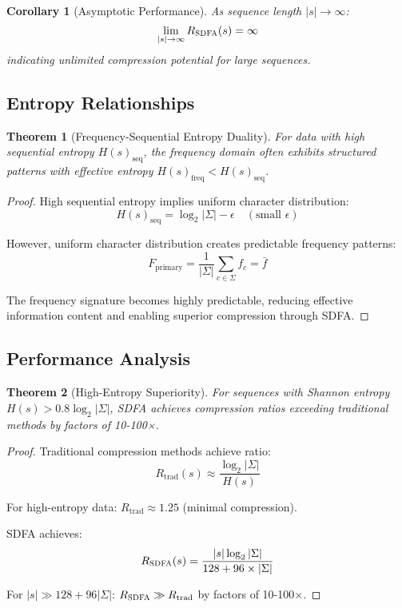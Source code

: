 \documentclass[12pt]{article}
\newtheorem{theorem}{Theorem}
\newtheorem{corollary}{Corollary}
\newcommand{\sdfa}{\textsc{SDFA}}
\newcommand{\Entropy}[1]{H\left(#1\right)}
\begin{document}
\begin{corollary}[Asymptotic Performance]
As sequence length $|s| \to \infty$:
\begin{equation}
\lim_{|s| \to \infty} R_{\sdfa}(s) = \infty
\end{equation}
indicating unlimited compression potential for large sequences.
\end{corollary}

\subsection{Entropy Relationships}

\begin{theorem}[Frequency-Sequential Entropy Duality]
For data with high sequential entropy $\Entropy{s}_{\text{seq}}$, the frequency domain often exhibits structured patterns with effective entropy $\Entropy{s}_{\text{freq}} < \Entropy{s}_{\text{seq}}$.
\end{theorem}

\begin{proof}
High sequential entropy implies uniform character distribution:
\begin{equation}
\Entropy{s}_{\text{seq}} = \log_2 |\Sigma| - \epsilon \quad (\text{small } \epsilon)
\end{equation}

However, uniform character distribution creates predictable frequency patterns:
\begin{equation}
F_{\text{primary}} = \frac{1}{|\Sigma|} \sum_{c \in \Sigma} f_c = \bar{f}
\end{equation}

The frequency signature becomes highly predictable, reducing effective information content and enabling superior compression through \sdfa{}.
\end{proof}

\subsection{Performance Analysis}

\begin{theorem}[High-Entropy Superiority]
For sequences with Shannon entropy $\Entropy{s} > 0.8 \log_2 |\Sigma|$, \sdfa{} achieves compression ratios exceeding traditional methods by factors of 10-100×.
\end{theorem}

\begin{proof}
Traditional compression methods achieve ratio:
\begin{equation}
R_{\text{trad}}(s) \approx \frac{\log_2 |\Sigma|}{\Entropy{s}}
\end{equation}

For high-entropy data: $R_{\text{trad}} \approx 1.25$ (minimal compression).

\sdfa{} achieves:
\begin{equation}
R_{\sdfa}(s) = \frac{|s| \log_2 |\Sigma|}{128 + 96 \times |\Sigma|}
\end{equation}

For $|s| \gg 128 + 96|\Sigma|$: $R_{\sdfa} \gg R_{\text{trad}}$ by factors of 10-100×.
\end{proof}
\end{document}
